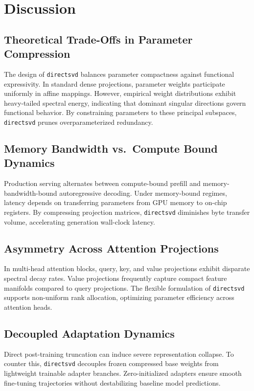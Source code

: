 \section{Discussion}

\subsection{Theoretical Trade-Offs in Parameter Compression}
The design of \texttt{directsvd} balances parameter compactness against functional expressivity. In standard dense projections, parameter weights participate uniformly in affine mappings. However, empirical weight distributions exhibit heavy-tailed spectral energy, indicating that dominant singular directions govern functional behavior. By constraining parameters to these principal subspaces, \texttt{directsvd} prunes overparameterized redundancy.

\subsection{Memory Bandwidth vs.\ Compute Bound Dynamics}
Production serving alternates between compute-bound prefill and memory-bandwidth-bound autoregressive decoding. Under memory-bound regimes, latency depends on transferring parameters from GPU memory to on-chip registers. By compressing projection matrices, \texttt{directsvd} diminishes byte transfer volume, accelerating generation wall-clock latency.

\subsection{Asymmetry Across Attention Projections}
In multi-head attention blocks, query, key, and value projections exhibit disparate spectral decay rates. Value projections frequently capture compact feature manifolds compared to query projections. The flexible formulation of \texttt{directsvd} supports non-uniform rank allocation, optimizing parameter efficiency across attention heads.

\subsection{Decoupled Adaptation Dynamics}
Direct post-training truncation can induce severe representation collapse. To counter this, \texttt{directsvd} decouples frozen compressed base weights from lightweight trainable adapter branches. Zero-initialized adapters ensure smooth fine-tuning trajectories without destabilizing baseline model predictions.

